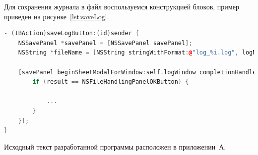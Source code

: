 Для сохранения журнала в файл воспользуемся конструкцией блоков, пример приведен
на рисунке~\ref{lst:saveLog}.
\begin{lstlisting}[basicstyle=\scriptsize\ttfamily,
                   numberstyle=\scriptsize\ttfamily,
                   xleftmargin=7mm,
                   language=C++,caption={Использование блока для сохранения файла журнала},
                   label=lst:saveLog]
- (IBAction)saveLogButton:(id)sender {
    NSSavePanel *savePanel = [NSSavePanel savePanel];
    NSString *fileName = [NSString stringWithFormat:@"log_%i.log", logNumber];

    [savePanel beginSheetModalForWindow:self.logWindow completionHandler:^(NSInteger result) {
        if (result == NSFileHandlingPanelOKButton) {

            ...
        }
    }];
}
\end{lstlisting}

Исходный текст разработанной программы расположен в приложении~А.

\pagebreak
